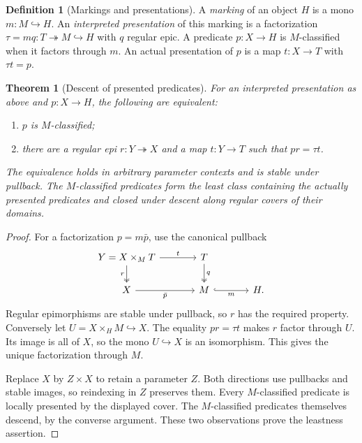 \documentclass[11pt,a4paper]{article}
\numberwithin{equation}{section}
\newtheorem{theorem}{Theorem}[section]
\theoremstyle{definition}
\newtheorem{definition}[definition]{Definition}
\theoremstyle{remark}
\theoremstyle{plain}
\newcommand{\onto}{\twoheadrightarrow}
\newcommand{\incl}{\hookrightarrow}
\begin{document}
\begin{definition}[Markings and presentations]
\label{def:interpreted-presentation}
A \emph{marking} of an object $H$ is a mono $m:M\incl H$.
An \emph{interpreted presentation} of this marking is a factorization
$\tau=mq:T\onto M\incl H$ with $q$ regular epic.
A predicate $p:X\to H$ is $M$-classified when it factors through $m$.
An actual presentation of $p$ is a map $t:X\to T$ with $\tau t=p$.
\end{definition}

\begin{theorem}[Descent of presented predicates]
\label{thm:predicate-descent}
For an interpreted presentation as above and $p:X\to H$, the following
are equivalent:
\begin{enumerate}
 \item $p$ is $M$-classified;
 \item there are a regular epi $r:Y\onto X$ and a map $t:Y\to T$
       such that $pr=\tau t$.
\end{enumerate}
The equivalence holds in arbitrary parameter contexts and is stable under
pullback. The $M$-classified predicates form the least class containing
the actually presented predicates and closed under descent along regular
covers of their domains.
\end{theorem}
\begin{proof}
For a factorization $p=m\bar p$, use the canonical pullback
\begin{equation}\label{diag:presentation-cover}
\begin{tikzcd}[column sep=large]
 Y=X\times_M T\ar[r,"t"]\ar[d,two heads,"r"']&
 T\ar[d,two heads,"q"]\\
 X\ar[r,"\bar p"']&M\ar[r,hook,"m"']&H.
\end{tikzcd}
\end{equation}
Regular epimorphisms are stable under pullback, so $r$ has the required
property. Conversely let $U=X\times_H M\incl X$. The equality
$pr=\tau t$ makes $r$ factor through $U$. Its image is all of $X$,
so the mono $U\incl X$ is an isomorphism. This gives the unique
factorization through $M$.

Replace $X$ by $Z\times X$ to retain a parameter $Z$. Both directions
use pullbacks and stable images, so reindexing in $Z$ preserves them.
Every $M$-classified predicate is locally presented by the displayed
cover. The $M$-classified predicates themselves descend, by the converse
argument. These two observations prove the leastness assertion.
\end{proof}
\end{document}
